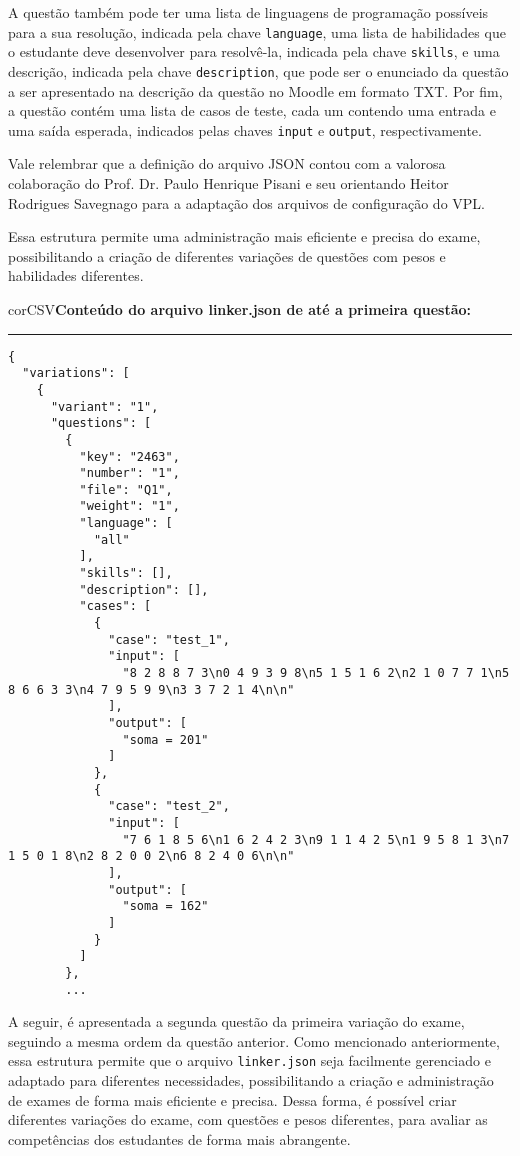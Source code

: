 A questão também pode ter uma lista de linguagens de programação possíveis para a sua resolução, indicada pela chave \verb|language|, uma lista de habilidades que o estudante deve desenvolver para resolvê-la, indicada pela chave \verb|skills|, e uma descrição, indicada pela chave \verb|description|, que pode ser o enunciado da questão a ser apresentado na descrição da questão no Moodle em formato TXT. Por fim, a questão contém uma lista de casos de teste, cada um contendo uma entrada e uma saída esperada, indicados pelas chaves \verb|input| e \verb|output|, respectivamente.

Vale relembrar que a definição do arquivo JSON contou com a valorosa colaboração do Prof. Dr. Paulo Henrique Pisani e seu orientando Heitor Rodrigues Savegnago para a
adaptação dos arquivos de configuração do VPL.

Essa estrutura permite uma administração mais eficiente e precisa do exame, possibilitando a criação de diferentes variações de questões com pesos e habilidades diferentes.


\begin{myboxCode}{corCSV}{\textbf{Conteúdo do arquivo linker.json de até a primeira questão:}}\vspace{3mm}
\hrule
{\scriptsize 
\begin{verbatim}
{
  "variations": [
    {
      "variant": "1",
      "questions": [
        {
          "key": "2463",
          "number": "1",
          "file": "Q1",
          "weight": "1",
          "language": [
            "all"
          ],
          "skills": [],
          "description": [],
          "cases": [
            {
              "case": "test_1",
              "input": [
                "8 2 8 8 7 3\n0 4 9 3 9 8\n5 1 5 1 6 2\n2 1 0 7 7 1\n5 8 6 6 3 3\n4 7 9 5 9 9\n3 3 7 2 1 4\n\n"
              ],
              "output": [
                "soma = 201"
              ]
            },
            {
              "case": "test_2",
              "input": [
                "7 6 1 8 5 6\n1 6 2 4 2 3\n9 1 1 4 2 5\n1 9 5 8 1 3\n7 1 5 0 1 8\n2 8 2 0 0 2\n6 8 2 4 0 6\n\n"
              ],
              "output": [
                "soma = 162"
              ]
            }
          ]
        },
        ...
\end{verbatim}
}
\end{myboxCode}

A seguir, é apresentada a segunda questão da primeira variação do exame, seguindo a mesma ordem da questão anterior. Como mencionado anteriormente, essa estrutura permite que o arquivo \verb|linker.json| seja facilmente gerenciado e adaptado para diferentes necessidades, possibilitando a criação e administração de exames de forma mais eficiente e precisa. Dessa forma, é possível criar diferentes variações do exame, com questões e pesos diferentes, para avaliar as competências dos estudantes de forma mais abrangente.


